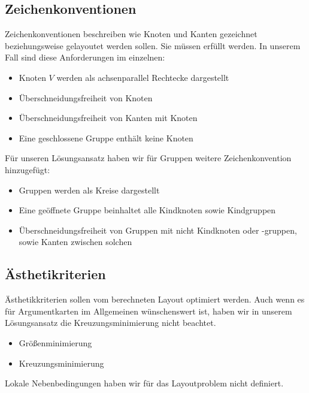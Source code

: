 \subsection{Zeichenkonventionen}
Zeichenkonventionen beschreiben wie Knoten und Kanten gezeichnet beziehungsweise gelayoutet werden sollen. Sie müssen erfüllt werden.
In unserem Fall sind diese Anforderungen im einzelnen:

\begin{itemize}
\item Knoten $V$ werden als achsenparallel Rechtecke dargestellt
\item Überschneidungsfreiheit von Knoten
\item Überschneidungsfreiheit von Kanten mit Knoten
\item Eine geschlossene Gruppe enthält keine Knoten
\end{itemize}

Für unseren Lösungsansatz haben wir für Gruppen weitere Zeichenkonvention hinzugefügt:
\begin{itemize}
\item Gruppen werden als Kreise dargestellt
\item Eine geöffnete Gruppe beinhaltet alle Kindknoten sowie Kindgruppen
\item Überschneidungsfreiheit von Gruppen mit nicht Kindknoten oder -gruppen, sowie Kanten zwischen solchen
\end{itemize}

\subsection{Ästhetikriterien}
Ästhetikkriterien sollen vom berechneten Layout optimiert werden. 
Auch wenn es für Argumentkarten im Allgemeinen wünschenswert ist, haben wir in unserem Lösungsansatz die Kreuzungsminimierung nicht beachtet.
\begin{itemize}
\item Größenminimierung 
\item Kreuzungsminimierung
\end{itemize}

Lokale Nebenbedingungen haben wir für das Layoutproblem nicht definiert.


